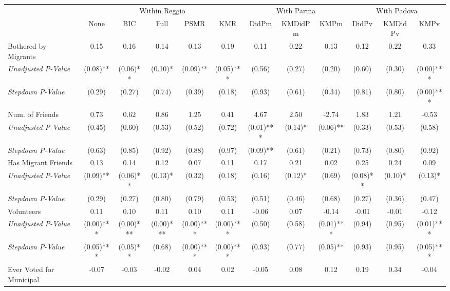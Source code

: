 \begin{tabular}{l c c c c c c c c c c c}
\toprule
& \multicolumn{5}{c}{Within Reggio} & \multicolumn{3}{c}{With Parma} & \multicolumn{3}{c}{With Padova} \\\cmidrule(lr){2-6} \cmidrule(lr){7-9} \cmidrule(lr){10-12}
 & None & BIC & Full & PSMR & KMR & DidPm & KMDidPm & KMPm & DidPv & KMDidPv & KMPv \\
\midrule
Bothered by Migrants & 0.15 & 0.16 & 0.14 & 0.13 & 0.19 & 0.11 & 0.22 & 0.13 & 0.12 & 0.22 & 0.33 \\
\quad \textit{Unadjusted P-Value} & (0.08)** & (0.06)** & (0.10)* & (0.09)** & (0.05)*** & (0.56) & (0.27) & (0.20) & (0.60) & (0.30) & (0.00)*** \\
\quad \textit{Stepdown P-Value} & (0.29) & (0.27) & (0.74) & (0.39) & (0.18) & (0.93) & (0.61) & (0.34) & (0.81) & (0.80) & (0.00)*** \\
Num. of Friends & 0.73 & 0.62 & 0.86 & 1.25 & 0.41 & 4.67 & 2.50 & -2.74 & 1.83 & 1.21 & -0.53 \\
\quad \textit{Unadjusted P-Value} & (0.45) & (0.60) & (0.53) & (0.52) & (0.72) & (0.01)*** & (0.14)* & (0.06)** & (0.33) & (0.53) & (0.58) \\
\quad \textit{Stepdown P-Value} & (0.63) & (0.85) & (0.92) & (0.88) & (0.97) & (0.09)** & (0.61) & (0.21) & (0.73) & (0.80) & (0.92) \\
Has Migrant Friends & 0.13 & 0.14 & 0.12 & 0.07 & 0.11 & 0.17 & 0.21 & 0.02 & 0.25 & 0.24 & 0.09 \\
\quad \textit{Unadjusted P-Value} & (0.09)** & (0.06)** & (0.13)* & (0.32) & (0.18) & (0.16) & (0.12)* & (0.69) & (0.08)** & (0.10)* & (0.13)* \\
\quad \textit{Stepdown P-Value} & (0.29) & (0.27) & (0.80) & (0.79) & (0.53) & (0.51) & (0.46) & (0.68) & (0.27) & (0.36) & (0.47) \\
Volunteers & 0.11 & 0.10 & 0.11 & 0.10 & 0.11 & -0.06 & 0.07 & -0.14 & -0.01 & -0.01 & -0.12 \\
\quad \textit{Unadjusted P-Value} & (0.00)*** & (0.00)*** & (0.00)*** & (0.00)*** & (0.00)*** & (0.50) & (0.58) & (0.01)*** & (0.94) & (0.95) & (0.01)*** \\
\quad \textit{Stepdown P-Value} & (0.05)*** & (0.05)** & (0.68) & (0.00)*** & (0.00)*** & (0.93) & (0.77) & (0.05)** & (0.93) & (0.95) & (0.05)*** \\
Ever Voted for Municipal & -0.07 & -0.03 & -0.02 & 0.04 & 0.02 & -0.05 & 0.08 & 0.12 & 0.19 & 0.34 & -0.04 \\

\end{tabular}
